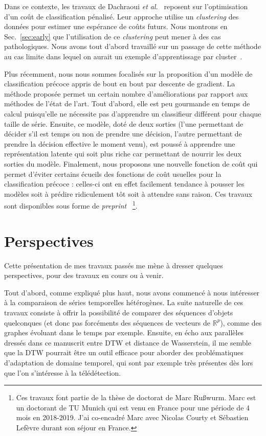 Dans ce contexte, les travaux de Dachraoui
\emph{et al.}~\cite{dachraoui2015early} reposent sur
l'optimisation d'un coût de classification
pénalisé.
Leur approche utilise un \emph{clustering} des données pour estimer une
espérance de coûts futurs.
Nous montrons en Sec.~\ref{sec:early} que l'utilisation de ce \emph{clustering}
peut mener à des cas pathologiques.
Nous avons tout d'abord travaillé sur un passage de cette méthode au cas limite
dans lequel on aurait un exemple d'apprentissage par
cluster~\cite{tavenard:halshs-01339007}.

Plus récemment, nous nous sommes focalisés sur la proposition d'un modèle de
classification précoce appris de bout en bout par descente de gradient.
La méthode proposée permet un certain nombre d'améliorations par rapport aux
méthodes de l'état de l'art.
Tout d'abord, elle est peu gourmande en temps de calcul puisqu'elle ne
nécessite pas d'apprendre un classifieur différent pour chaque taille de série.
Ensuite, ce modèle, doté de deux sorties (l'une permettant de décider s'il est
temps ou non de prendre une décision, l'autre permettant de prendre la décision
effective le moment venu), est poussé à apprendre une représentation latente
qui soit plus riche car permettant de nourrir les deux sorties du modèle.
Finalement, nous proposons une nouvelle fonction de coût qui permet d'éviter
certains écueils des fonctions de coût usuelles pour la classification précoce :
celles-ci ont en effet facilement tendance à pousser les modèles soit à prédire
ridiculement tôt soit à attendre sans raison.
Ces travaux sont disponibles sous forme de
\emph{preprint}~\cite{ruwurm:hal-02174314}%
\footnote{Ces travaux font partie de la thèse de doctorat de Marc Rußwurm.
Marc est un doctorant de TU Munich qui est venu en France pour une période de
4 mois en 2018-2019. J'ai co-encadré Marc avec Nicolas Courty
et Sébastien Lefèvre durant son séjour en France.}.

\section*{Perspectives}

Cette présentation de mes travaux passés me mène à dresser quelques
perspectives, pour des travaux en cours ou à venir.

Tout d'abord, comme expliqué plus haut, nous avons commencé à nous intéresser à
la comparaison de séries temporelles hétérogènes.
La suite naturelle de ces travaux consiste à offrir la possibilité de comparer
des séquences d'objets
quelconques (et donc pas forcéments des séquences de vecteurs de
$\mathbb{R}^p$), comme des graphes évoluant dans le temps par exemple.
Ensuite, en écho aux parallèles dressés dans ce manuscrit entre DTW et distance
de Wasserstein, il me semble que la DTW pourrait être un outil efficace pour
aborder des problématiques d'adaptation de domaine temporel, qui sont par
exemple très présentes dès lors que l'on s'intéresse à la télédétection.

